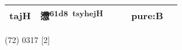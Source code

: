 \documentclass[14pt,a4paper]{scrartcl}
\begin{document}
\begin{longtable}[c]{@{}llllll@{}}
\begin{minipage}[t]{0.14\columnwidth}
tajH
\strut\end{minipage} &
\begin{minipage}[t]{0.14\columnwidth}\raggedright\strut
懘\textsuperscript{61d8~tsyhejH}
\strut\end{minipage} &
\begin{minipage}[t]{0.14\columnwidth}\raggedright\strut
\strut\end{minipage} &
\begin{minipage}[t]{0.14\columnwidth}\raggedright\strut
\strut\end{minipage} &
\begin{minipage}[t]{0.14\columnwidth}\raggedright\strut
pure:B
\strut\end{minipage}\tabularnewline
\bottomrule
\end{longtable}

(72) 0317 {[}2{]}
\end{document}
